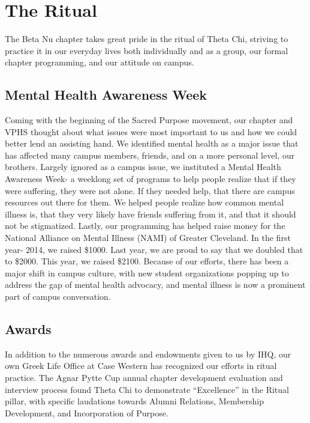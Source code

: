 \chapter{The Ritual}
  
  The Beta Nu chapter takes great pride in the ritual of Theta Chi, striving to practice it in our everyday lives both individually and as a group, our formal chapter programming, and our attitude on campus.

  \section*{Mental Health Awareness Week}
    Coming with the beginning of the Sacred Purpose movement, our chapter and VPHS thought about what
issues were most important to us and how we could better lend an assisting hand. We identified mental
health as a major issue that has affected many campus members, friends, and on a more personal level, our brothers. Largely ignored as a campus issue, we instituted a Mental Health Awareness Week- a weeklong set of programs to help people realize that if they were suffering, they were not alone. If they needed help, that there are campus resources out there for them. We helped people realize how common mental illness is, that they very likely have friends suffering from it, and that it should not be stigmatized. Lastly, our programming has helped raise money for the National Alliance on Mental Illness (NAMI) of Greater Cleveland. In the first year- 2014, we raised \$1000. Last year, we are proud to say that we doubled that to \$2000.  This year, we raised \$2100. Because of our efforts, there has been a major shift in campus culture, with new student organizations popping up to address the gap of mental health advocacy, and mental illness is now a prominent part of campus conversation.
    
  \section*{Awards}
    In addition to the numerous awards and endowments given to us by IHQ, our own Greek Life Office at Case Western has recognized our efforts in ritual practice. The Agnar Pytte Cup annual chapter development evaluation and interview process found Theta Chi to demonstrate “Excellence” in the Ritual pillar, with specific laudations towards Alumni Relations, Membership Development, and Incorporation of Purpose. \\
    
